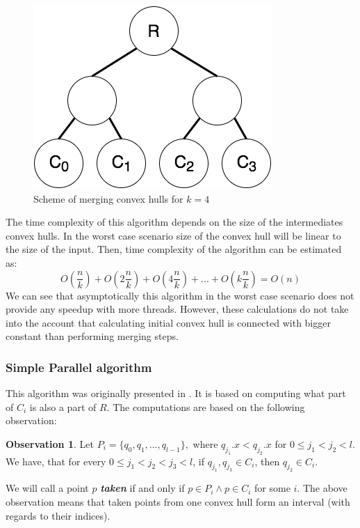 \documentclass[letterpaper]{article}
\theoremstyle{definition}
\newtheorem{observation}{Observation}
\begin{document}
\begin{figure}\centering
  \includegraphics[scale=0.5]{img/naive-parallel}
  \caption{Scheme of merging convex hulls for $k=4$}
  \label{fig:naive-parallel-scheme}
\end{figure}

The time complexity of this algorithm depends on the size of the intermediates convex hulls.
In the worst case scenario size of the convex hull will be linear to the size of the input.
Then, time complexity of the algorithm can be estimated as:
$$O(\frac{n}{k}) + O(2\frac{n}{k}) + O(4\frac{n}{k}) + ... + O(k\frac{n}{k}) = O(n)$$
We can see that asymptotically this algorithm in the worst case scenario does not provide any speedup with more threads.
However, these calculations do not take into the account that calculating initial convex hull is connected with bigger constant than performing merging steps. 

\subsubsection{Simple Parallel algorithm}

This algorithm was originally presented in \cite{SimpleParallel}.
It is based on computing what part of $C_i$ is also a part of $R$.
The computations are based on the following observation:
\begin{observation}
Let $P_i = \{q_0, q_1, ..., q_{l-1} \},$ where  $q_{j_1}.x < q_{j_2}.x$ for $0 \leq j_1 < j_2 < l$. 
We have, that for every $0 \leq j_1 < j_2 < j_3 < l$, if $q_{j_1}, q_{j_3} \in C_i$, then $q_{j_2} \in C_i$.
\end{observation}
We will call a point $p$ {\it\bf taken} if and only if $p \in P_i \land p \in C_i$ for some $i$. 
The above observation means that taken points from one convex hull form an interval (with regards to their indices).
\end{document}
